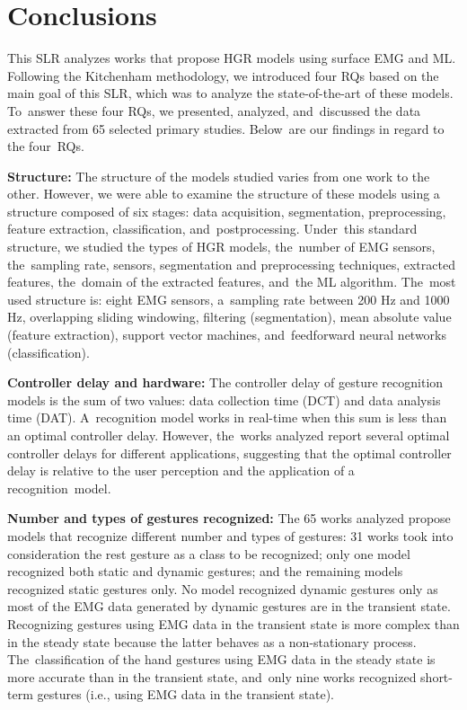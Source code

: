 \documentclass[sensors,review,accept,moreauthors,pdftex]{Definitions/mdpi}
\begin{document}
\section{Conclusions}\label{sec:4}

This SLR analyzes works that propose HGR models using surface EMG and ML. Following the Kitchenham methodology, we introduced four RQs based on the main goal of this SLR, which was to analyze the state-of-the-art of these models. To~answer these four RQs, we presented, analyzed, and~discussed the data extracted from 65 selected primary studies. Below~are our findings in regard to the four~RQs.

\textbf{Structure:} The structure of the models studied varies from one work to the other. However, we were able to examine the structure of these models using a structure composed of six stages: data acquisition, segmentation, preprocessing, feature extraction, classification, and~postprocessing. Under~this standard structure, we studied the types of HGR models, the~number of EMG sensors, the~sampling rate, sensors, segmentation and preprocessing techniques, extracted features, the~domain of the extracted features, and~the ML algorithm. The~most used structure is: eight EMG sensors, a~sampling rate between 200 Hz and 1000 Hz, overlapping sliding windowing, filtering (segmentation), mean absolute value (feature extraction), support vector machines, and~feedforward neural networks (classification).

\textbf{Controller delay and hardware:} The controller delay of gesture recognition models is the sum of two values: data collection time (DCT) and data analysis time (DAT). A~recognition model works in real-time when this sum is less than an optimal controller delay. However, the~works analyzed report several optimal controller delays for different applications, suggesting that the optimal controller delay is relative to the user perception and the application of a recognition~model. 

\textbf{Number and types of gestures recognized:} The 65 works analyzed propose models that recognize different number and types of gestures: 31 works took into consideration the rest gesture as a class to be recognized; only one model recognized both static and dynamic gestures; and the remaining models recognized static gestures only. No model recognized dynamic gestures only as most of the EMG data generated by dynamic gestures are in the transient state. Recognizing gestures using EMG data in the transient state is more complex than in the steady state because the latter behaves as a non-stationary process. The~classification of the hand gestures using EMG data in the steady state is more accurate than in the transient state, and~only nine works recognized short-term gestures (i.e., using EMG data in the transient state). 
\end{document}
